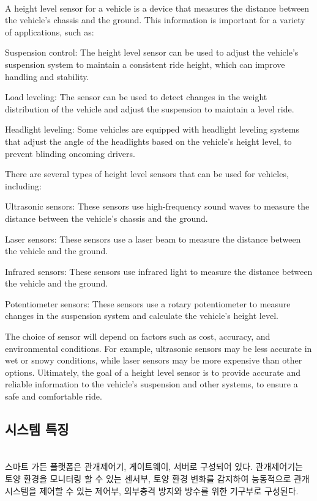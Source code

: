 \documentclass[11pt]{article}
\begin{document}
\indent \\A height level sensor for a vehicle is a device that measures the distance between the vehicle's chassis and the ground. This information is important for a variety of applications, such as:

Suspension control: The height level sensor can be used to adjust the vehicle's suspension system to maintain a consistent ride height, which can improve handling and stability.

Load leveling: The sensor can be used to detect changes in the weight distribution of the vehicle and adjust the suspension to maintain a level ride.

Headlight leveling: Some vehicles are equipped with headlight leveling systems that adjust the angle of the headlights based on the vehicle's height level, to prevent blinding oncoming drivers.

There are several types of height level sensors that can be used for vehicles, including:

Ultrasonic sensors: These sensors use high-frequency sound waves to measure the distance between the vehicle's chassis and the ground.

Laser sensors: These sensors use a laser beam to measure the distance between the vehicle and the ground.

Infrared sensors: These sensors use infrared light to measure the distance between the vehicle and the ground.

Potentiometer sensors: These sensors use a rotary potentiometer to measure changes in the suspension system and calculate the vehicle's height level.

The choice of sensor will depend on factors such as cost, accuracy, and environmental conditions. For example, ultrasonic sensors may be less accurate in wet or snowy conditions, while laser sensors may be more expensive than other options. Ultimately, the goal of a height level sensor is to provide accurate and reliable information to the vehicle's suspension and other systems, to ensure a safe and comfortable ride.

\subsection{시스템 특징}
\indent \\스마트 가든 플랫폼은 관개제어기, 게이트웨이, 서버로 구성되어 있다. 관개제어기는 토양 환경을 모니터링 할 수 있는 센서부, 토양 환경 변화를 감지하여 능동적으로 관개시스템을 제어할 수 있는 제어부, 외부충격 방지와 방수를 위한 기구부로 구성된다. 
\end{document}
